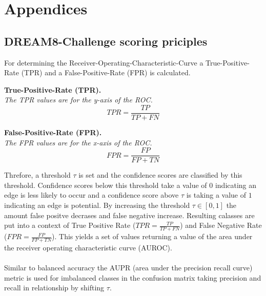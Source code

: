 \appendix

\chapter{Appendices}
\section{DREAM8-Challenge scoring priciples}

For determining the Receiver-Operating-Characteristic-Curve a True-Positive-Rate (TPR) and a False-Positive-Rate (FPR) is calculated.\\
\begin{defn}\textbf{True-Positive-Rate (TPR).}\\
\textit{The TPR values are for the y-axis of the ROC.}
\begin{equation}
TPR=\frac{TP}{TP+FN}
\end{equation}
\end{defn}
\begin{defn}
\textbf{False-Positive-Rate (FPR).}\\
\textit{The FPR values are for the x-axis of the ROC.}
\begin{equation}
FPR=\frac{FP}{FP+TN}
\end{equation}
\end{defn}

Threfore, a threshold $\tau$ is set and the confidence scores are classified by this threshold.  Confidence scores below this threshold take a value of $0$ indicating an edge is less likely to occur and a confidence score above $\tau$ is taking a value of $1$ indicating an edge is potential. By increasing the threshold $\tau\in[0,1]$ the amount false positve decrases and false negative increase. 
Resulting calasses are put into a context of True Positive Rate ($TPR=\frac{TP}{TP+FN}$) and False Negative Rate ($FPR=\frac{FP}{FP+TN}$). This yields a set of values returning a value of the area under the receiver operating characteristic curve (AUROC).\\\\   
Similar to balanced accuracy the AUPR (area under the precision recall curve) metric is used for imbalanced classes in the confusion matrix taking precision and recall in relationship by shifting $\tau$.

